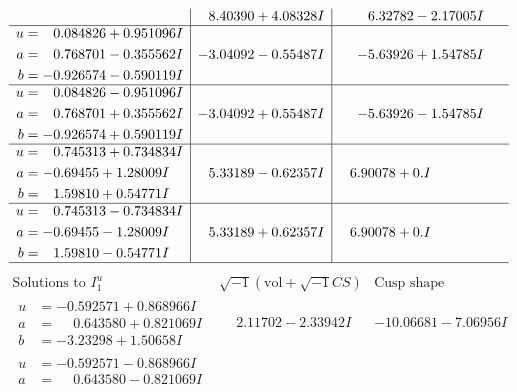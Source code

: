 \documentclass[1p]{elsarticle_modified}
\theoremstyle{definition}
\newcommand{\I}{\sqrt{-1}}
\begin{document}
$$\begin{array}{c|c|c}
 & \phantom{-}8.40390 + 4.08328 I & \phantom{-}6.32782 - 2.17005 I \\ \hline\begin{aligned}
u &= \phantom{-}0.084826 + 0.951096 I \\
a &= \phantom{-}0.768701 - 0.355562 I \\
b &= -0.926574 - 0.590119 I\end{aligned}
 & -3.04092 - 0.55487 I & -5.63926 + 1.54785 I \\ \hline\begin{aligned}
u &= \phantom{-}0.084826 - 0.951096 I \\
a &= \phantom{-}0.768701 + 0.355562 I \\
b &= -0.926574 + 0.590119 I\end{aligned}
 & -3.04092 + 0.55487 I & -5.63926 - 1.54785 I \\ \hline\begin{aligned}
u &= \phantom{-}0.745313 + 0.734834 I \\
a &= -0.69455 + 1.28009 I \\
b &= \phantom{-}1.59810 + 0.54771 I\end{aligned}
 & \phantom{-}5.33189 - 0.62357 I & \phantom{-}6.90078 + 0. I\phantom{ +0.000000I} \\ \hline\begin{aligned}
u &= \phantom{-}0.745313 - 0.734834 I \\
a &= -0.69455 - 1.28009 I \\
b &= \phantom{-}1.59810 - 0.54771 I\end{aligned}
 & \phantom{-}5.33189 + 0.62357 I & \phantom{-}6.90078 + 0. I\phantom{ +0.000000I}\\
 \hline 
 \end{array}$$\newpage$$\begin{array}{c|c|c}  
\text{Solutions to }I^u_{1}& \I (\text{vol} + \sqrt{-1}CS) & \text{Cusp shape}\\
 \hline 
\begin{aligned}
u &= -0.592571 + 0.868966 I \\
a &= \phantom{-}0.643580 + 0.821069 I \\
b &= -3.23298 + 1.50658 I\end{aligned}
 & \phantom{-}2.11702 - 2.33942 I & -10.06681 - 7.06956 I \\ \hline\begin{aligned}
u &= -0.592571 - 0.868966 I \\
a &= \phantom{-}0.643580 - 0.821069 I \\

\end{aligned}
\end{array}$$
\end{document}
